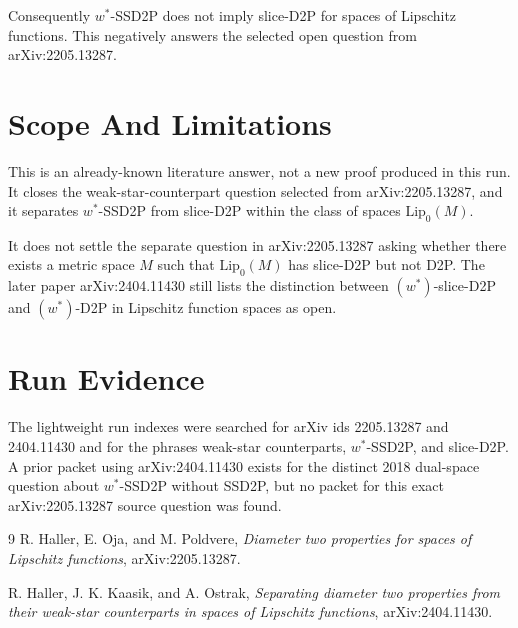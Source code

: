 \documentclass[11pt]{article}
\begin{document}
Consequently \(w^\ast\)-SSD2P does not imply slice-D2P for spaces of
Lipschitz functions. This negatively answers the selected open question from
arXiv:2205.13287.

\section*{Scope And Limitations}

This is an already-known literature answer, not a new proof produced in this
run. It closes the weak-star-counterpart question selected from
arXiv:2205.13287, and it separates \(w^\ast\)-SSD2P from slice-D2P within the
class of spaces \(\mathrm{Lip}_0(M)\).

It does not settle the separate question in arXiv:2205.13287 asking whether
there exists a metric space \(M\) such that \(\mathrm{Lip}_0(M)\) has
slice-D2P but not D2P. The later paper arXiv:2404.11430 still lists the
distinction between \((w^\ast)\)-slice-D2P and \((w^\ast)\)-D2P in Lipschitz
function spaces as open.

\section*{Run Evidence}

The lightweight run indexes were searched for arXiv ids 2205.13287 and
2404.11430 and for the phrases weak-star counterparts, \(w^\ast\)-SSD2P, and
slice-D2P. A prior packet using arXiv:2404.11430 exists for the distinct
2018 dual-space question about \(w^\ast\)-SSD2P without SSD2P, but no packet
for this exact arXiv:2205.13287 source question was found.

\begin{thebibliography}{9}
R. Haller, E. Oja, and M. Poldvere,
\emph{Diameter two properties for spaces of Lipschitz functions},
arXiv:2205.13287.

R. Haller, J. K. Kaasik, and A. Ostrak,
\emph{Separating diameter two properties from their weak-star counterparts in
spaces of Lipschitz functions}, arXiv:2404.11430.
\end{thebibliography}
\end{document}

